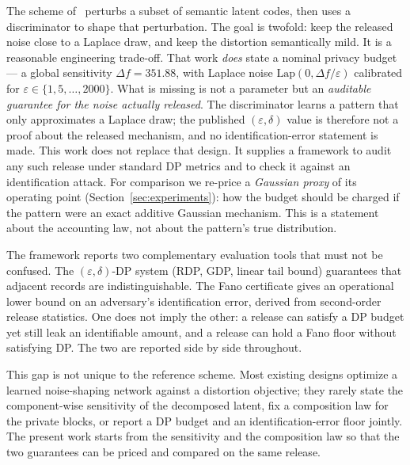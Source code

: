 \documentclass{ieeetj}
\theoremstyle{plain}
\theoremstyle{definition}
\begin{document}
The scheme of~\cite{arXiv2510} perturbs a subset of semantic latent codes, then uses a discriminator
to shape that perturbation. The goal is twofold: keep the released noise close to a
Laplace draw, and keep the distortion semantically mild. It is a reasonable engineering
trade-off. That work \emph{does} state a nominal privacy budget --- a global sensitivity $\Delta f=351.88$,
with Laplace noise $\mathrm{Lap}(0,\Delta f/\varepsilon)$ calibrated for $\varepsilon\in\{1,5,\ldots,2000\}$. What is missing is not a parameter but an
\emph{auditable guarantee for the noise actually released}. The discriminator learns a pattern that only approximates a Laplace draw; the
published $(\varepsilon,\delta)$ value is therefore not a proof about the released mechanism, and no
identification-error statement is made. This work does not replace that design. It
supplies a framework to audit any such release under standard DP metrics and to check it
against an identification attack. For comparison we re-price a \emph{Gaussian proxy} of its operating
point (Section~\ref{sec:experiments}): how the budget should be charged if the pattern were an exact
additive Gaussian mechanism. This is a statement about the accounting law, not about the
pattern's true distribution.

The framework reports two complementary evaluation tools that must not be
confused. The $(\varepsilon,\delta)$-DP system (RDP, GDP, linear tail bound)
guarantees that adjacent records are indistinguishable. The Fano certificate
gives an operational lower bound on an adversary's identification error,
derived from second-order release statistics. One does not imply the other: a
release can satisfy a DP budget yet still leak an identifiable amount, and a
release can hold a Fano floor without satisfying DP. The two are reported side
by side throughout.

This gap is not unique to the reference scheme. Most existing designs optimize a learned
noise-shaping network against a distortion objective; they rarely state the
component-wise sensitivity of the decomposed latent, fix a composition law for
the private blocks, or report a DP budget and an identification-error floor
jointly. The present work starts from the sensitivity and the composition law
so that the two guarantees can be priced and compared on the same release.
\end{document}
